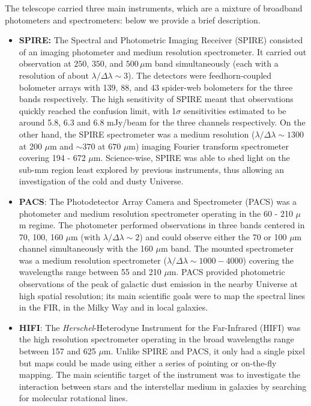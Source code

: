 The telescope carried three main instruments, which are a mixture of broadband photometers and spectrometers: below we provide a brief description.
\begin{itemize}
\item{\textbf{ SPIRE:} The Spectral and Photometric Imaging Receiver (SPIRE) \citep{Griffin2010} consisted of an imaging photometer and medium resolution spectrometer. It carried out observation at $250$, $350$, and $500\,\mu$m band simultaneously (each with a resolution of about $\lambda/\Delta\lambda \sim 3$). The detectors were feedhorn-coupled bolometer arrays with 139, 88, and 43 spider-web bolometers for the three bands respectively. The high sensitivity of SPIRE meant that observations quickly reached the confusion limit, with 1$\sigma$ sensitivities estimated to be around 5.8, 6.3 and 6.8 mJy/beam for the three channels respectively. On the other hand, the SPIRE spectrometer was a medium resolution ($\lambda/\Delta\lambda \sim 1300$ at 200 $\mu$m and $\sim 370$ at $670$ $\mu$m) imaging Fourier transform spectrometer covering 194 - 672 $\mu$m. Science-wise, SPIRE was able to shed light on the sub-mm region least explored by previous instruments, thus allowing an investigation of the cold and dusty Universe.}

\item{\textbf{ PACS}: The Photodetector Array Camera and Spectrometer (PACS) \citep{Poglitsch2010} was a photometer and medium resolution spectrometer operating in the 60 - 210 $\mu$m regime. The photometer performed observations in three bands centered in 70, 100, 160 $\mu$m (with $\lambda/\Delta\lambda \sim 2$) and could observe either the 70 or 100 $\mu$m channel simultaneously with the 160 $\mu$m band. The mounted spectrometer was a medium resolution spectrometer ($\lambda/\Delta\lambda \sim 1000 - 4000$) covering the wavelengths range between 55 and 210 $\mu$m. PACS provided photometric observations of the peak of galactic dust emission in the nearby Universe at high spatial resolution; its main  scientific goals  were to map the spectral lines in the \gls{FIR}, in the Milky Way and in local galaxies.}

\item{\textbf{ HIFI}: The \textit{Herschel}-Heterodyne Instrument for the Far-Infrared (HIFI) was the high resolution spectrometer operating in the broad wavelengths range between 157 and 625 $\mu$m. Unlike SPIRE and PACS, it only had a single pixel but maps could be made using either a series of pointing or on-the-fly mapping. The main scientific target of the instrument was to investigate the interaction between stars and the interstellar medium in galaxies by searching for molecular rotational lines.}
\end{itemize}

